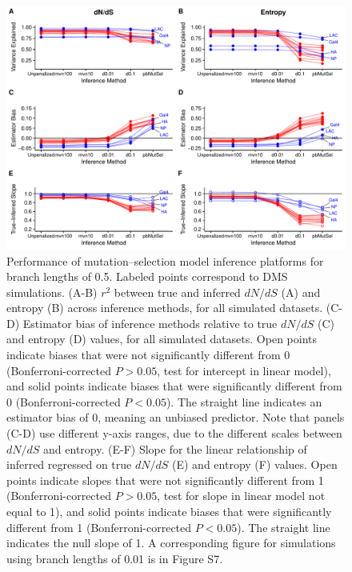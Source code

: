 \documentclass[11pt]{article}
\begin{document}
\vspace{3cm}
\begin{figure}[htbp]
  \centerline{\includegraphics[width=5.5in]{Figures/r2_bias_slope_bl0_5.pdf}}
\caption{\label{fig:r2_bias_slope}
Performance of mutation--selection model inference platforms for branch lengths of 0.5. Labeled points correspond to DMS simulations. (A-B) $r^2$ between true and inferred $dN/dS$ (A) and entropy (B) across inference methods, for all simulated datasets. (C-D) Estimator bias of inference methods relative to true $dN/dS$ (C) and entropy (D) values, for all simulated datasets. Open points indicate biases that were not significantly different from 0 (Bonferroni-corrected $P>0.05$, test for intercept in linear model), and solid points indicate biases that were significantly different from 0 (Bonferroni-corrected $P<0.05$). The straight line indicates an estimator bias of 0, meaning an unbiased predictor. Note that panels (C-D) use different y-axis ranges, due to the different scales between $dN/dS$ and entropy. (E-F) Slope for the linear relationship of inferred regressed on true $dN/dS$ (E) and entropy (F) values. Open points indicate slopes that were not significantly different from 1 (Bonferroni-corrected $P>0.05$, test for slope in linear model not equal to 1), and solid points indicate biases that were significantly different from 1 (Bonferroni-corrected $P<0.05$). The straight line indicates the null slope of 1. A corresponding figure for simulations using branch lengths of 0.01 is in Figure S7.}
\end{figure}
\end{document}
